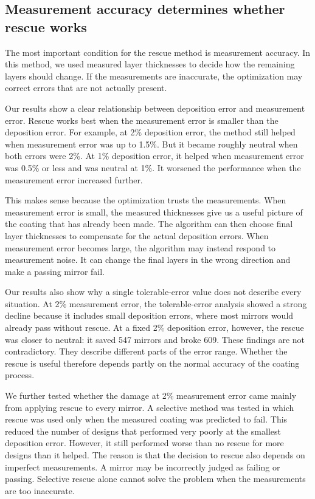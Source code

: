 \subsection{Measurement accuracy determines whether rescue works}

The most important condition for the rescue method is measurement accuracy. In this method, we used measured layer thicknesses to decide how the remaining layers should change. If the measurements are inaccurate, the optimization may correct errors that are not actually present.

Our results show a clear relationship between deposition error and measurement error. Rescue works best when the measurement error is smaller than the deposition error. For example, at 2\% deposition error, the method still helped when measurement error was up to 1.5\%. But it became roughly neutral when both errors were 2\%. At 1\% deposition error, it helped when measurement error was 0.5\% or less and was neutral at 1\%. It worsened the performance when the measurement error increased further.

This makes sense because the optimization trusts the measurements. When measurement error is small, the measured thicknesses give us a useful picture of the coating that has already been made. The algorithm can then choose final layer thicknesses to compensate for the actual deposition errors. When measurement error becomes large, the algorithm may instead respond to measurement noise. It can change the final layers in the wrong direction and make a passing mirror fail.

Our results also show why a single tolerable-error value does not describe every situation. At 2\% measurement error, the tolerable-error analysis showed a strong decline because it includes small deposition errors, where most mirrors would already pass without rescue. At a fixed 2\% deposition error, however, the rescue was closer to neutral: it saved 547 mirrors and broke 609. These findings are not contradictory. They describe different parts of the error range. Whether the rescue is useful therefore depends partly on the normal accuracy of the coating process.

We further tested whether the damage at 2\% measurement error came mainly from applying rescue to every mirror. A selective method was tested in which rescue was used only when the measured coating was predicted to fail. This reduced the number of designs that performed very poorly at the smallest deposition error. However, it still performed worse than no rescue for more designs than it helped. The reason is that the decision to rescue also depends on imperfect measurements. A mirror may be incorrectly judged as failing or passing. Selective rescue alone cannot solve the problem when the measurements are too inaccurate.

